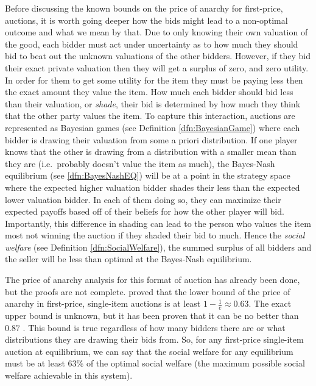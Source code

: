 \documentclass[12pt,twoside]{reedthesis}
\begin{document}
Before discussing the known bounds on the price of anarchy for first-price, auctions, it is worth going deeper how the bids might lead to a non-optimal outcome and what we mean by that. Due to only knowing their own valuation of the good, each bidder must act under uncertainty as to how much they should bid to beat out the unknown valuations of the other bidders. However, if they bid their exact private valuation then they will get a surplus of zero, and zero utility. In order for them to get some utility for the item they must be paying less then the exact amount they value the item. How much each bidder should bid less than their valuation, or {\em shade}, their bid is determined by how much they think that the other party values the item. To capture this interaction, auctions are represented as Bayesian games (see Definition \ref{dfn:BayesianGame}) where each bidder is drawing their valuation from some a priori distribution. If one player knows that the other is drawing from a distribution with a smaller mean than they are (i.e.~probably doesn't value the item as much), the Bayes-Nash equilibrium (see \ref{dfn:BayesNashEQ}) will be at a point in the strategy space where the expected higher valuation bidder shades their less than the expected lower valuation bidder. In each of them doing so, they can maximize their expected payoffs based off of their beliefs for how the other player will bid. Importantly, this difference in shading can lead to the person who values the item most not winning the auction if they shaded their bid to much. Hence the {\em social welfare} (see Definition \ref{dfn:SocialWelfare}), the summed surplus of all bidders and the seller will be less than optimal at the Bayes-Nash equilibrium. 

The price of anarchy analysis for this format of auction has already been done, but the proofs are not complete. \cite{Syrgkanis2013} proved that the lower bound of the price of anarchy in first-price, single-item auctions is at least $1 - \frac{1}{e} \approx 0.63$. The exact upper bound is unknown, but it has been proven that it can be no better than $0.87$ \citep{Hartline2015}. This bound is true regardless of how many bidders there are or what distributions they are drawing their bids from. So, for any first-price single-item auction at equilibrium, we can say that the social welfare for any equilibrium must be at least $63\%$ of the optimal social welfare (the maximum possible social welfare achievable in this system). 
\end{document}
